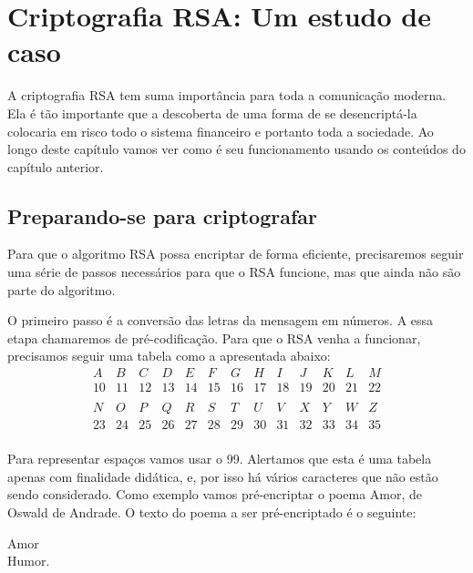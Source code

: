 \pagestyle{fancy}
\fancyhead[R]{\thepage}
\fancyfoot[C]{}
\chapter {Criptografia RSA: Um estudo de caso}
\label{RSA}

A criptografia RSA tem suma import\^ancia para toda a comunica\c{c}\~ao moderna. Ela \'e t\~ao importante que a descoberta de uma forma de se desencript\'a-la colocaria em risco todo o sistema financeiro e portanto toda a sociedade. Ao longo deste cap\'itulo vamos ver como \'e seu funcionamento usando os conte\'udos do cap\'itulo anterior.

\section{Preparando-se para criptografar}

Para que o algoritmo RSA possa encriptar de forma eficiente, precisaremos seguir uma s\'erie de passos necess\'arios para que o RSA funcione, mas que ainda n\~ao s\~ao parte do algoritmo.

O primeiro passo \'e a convers\~ao das letras da mensagem em n\'umeros. A essa etapa chamaremos de pr\'e-codifica\c{c}\~ao. Para que o RSA venha a funcionar, precisamos seguir uma tabela como a apresentada abaixo:
\[
\begin{array}{ccccccccccccc}
A & B & C & D & E & F & G & H & I & J  &  K  & L  & M  \\ 
10 & 11 & 12 & 13 & 14 & 15 & 16 & 17 & 18 & 19 &  20 & 21 & 22 \\ 
\\
N & O  & P  & Q  & R  & S & T  & U  & V  & X  & Y  & W  & Z \\
23 & 24 & 25 & 26 & 27 & 28 & 29 & 30 & 31 & 32 & 33 & 34 & 35 \\
\end{array}
\]

Para representar espa\c{c}os vamos usar o 99. Alertamos que esta \'e uma tabela apenas com finalidade did\'atica, e, por isso h\'a v\'arios caracteres que n\~ao est\~ao sendo considerado. Como exemplo vamos pr\'e-encriptar o poema Amor, de Oswald de Andrade. O texto do poema a ser pr\'e-encriptado \'e o seguinte:

\begin{center}
Amor  \\ 
Humor. \\ 
\end{center}

